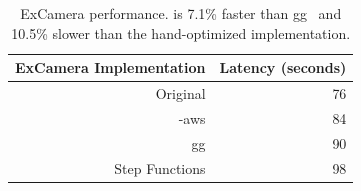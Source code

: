 
\begin{table}
  \centering
  \begin{tabular}{|r|r|}
    \hline
    \textbf{ExCamera Implementation} & \textbf{Latency (seconds)} \\ \hline
    Original        & 76                         \\ \hline
    \name{}-aws & 84                         \\ \hline
    gg                       & 90                         \\ \hline
    Step Functions & 98                         \\ \hline
  \end{tabular}
  \caption{ExCamera performance. \name{} is 7.1\% faster than
gg~\cite{gg-atc} and 10.5\% slower than the hand-optimized implementation.}
  \label{table:excamera}
\end{table}


